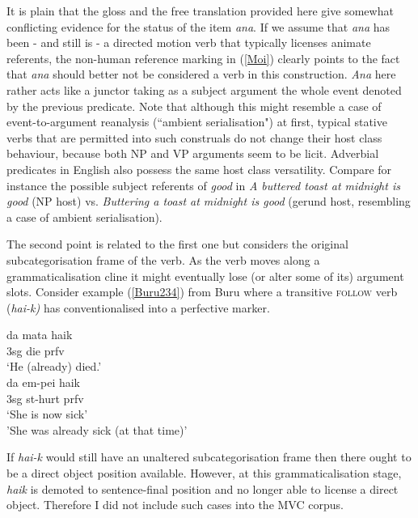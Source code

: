 It is plain that the gloss and the free translation provided here give somewhat conflicting evidence for the status of the item \textit{ana}. If we assume that \textit{ana} has been - and still is - a directed motion verb that typically licenses animate referents, the non-human reference marking in (\ref{Moi}) clearly points to the fact that \textit{ana} should better not be considered a verb in this construction. \textit{Ana} here rather acts like a junctor taking as a subject argument the whole event denoted by the previous predicate. Note that although this might resemble a case of event-to-argument reanalysis (``ambient serialisation") at first, typical stative verbs that are permitted into such construals do not change their host class behaviour, because both NP and VP arguments seem to be licit. Adverbial predicates in English also possess the same host class versatility. Compare for instance the possible subject referents of \textit{good} in \textit{A buttered toast at midnight is good} (NP host) vs. \textit{Buttering a toast at midnight is good} (gerund host, resembling a case of ambient serialisation).

The second point is related to the first one but considers the original subcategorisation frame of the verb. As the verb moves along a grammaticalisation cline it might eventually lose (or alter some of its) argument slots. Consider example (\ref{Buru234}) from Buru where a transitive \textsc{follow} verb (\textit{hai-k)} has conventionalised into a perfective marker.

\pex \label{Buru234}
\a \label{}
\gll da mata haik \\
3\acs{sg} die \acs{prfv} \\
\glft `He (already) died.' \\ 
\z
\a \label{}
\gla da em-pei haik \\ 
3\acs{sg} \acs{st}-hurt \acs{prfv} \\
\glft `She is now sick' \\
  'She was already sick (at that time)' \\ 
\z
\xe

If \textit{hai-k} would still have an unaltered subcategorisation frame then there ought to be a direct object position available. However, at this grammaticalisation stage, \textit{haik} is demoted to sentence-final position and no longer able to license a direct object. Therefore I did not include such cases into the MVC corpus.

